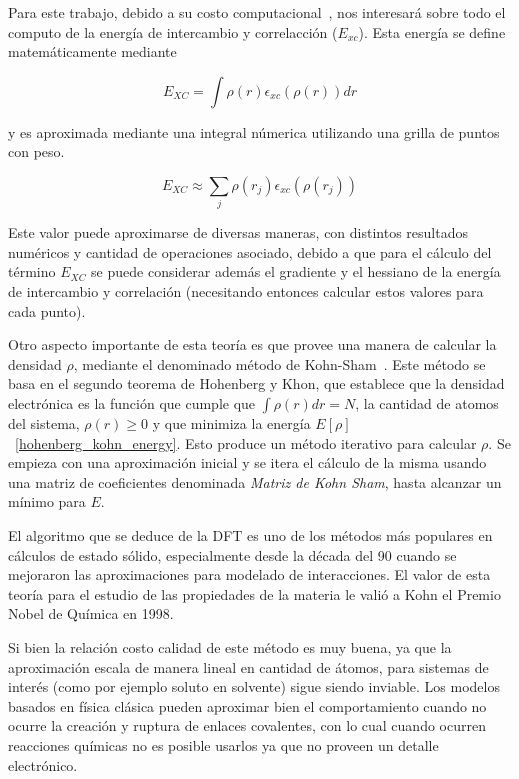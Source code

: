 Para este trabajo, debido a su costo computacional~\cite{LIO}, nos interesar\'a sobre todo el computo de la energ\'ia de intercambio y correlacci\'on ($E_{xc}$).
Esta energ\'ia se define matem\'aticamente mediante

\begin{equation}
    E_{XC} = \int \rho(r) \epsilon_{xc}\left( \rho(r) \right ) dr
\end{equation}

y es aproximada mediante una integral n\'umerica utilizando una grilla de puntos con peso.

\begin{equation}
    \label{approx_excenergy}
    E_{XC} \approx \sum_j \rho(r_j) \epsilon_{xc} (\rho(r_j))
\end{equation}

Este valor puede aproximarse de diversas maneras, con distintos resultados num\'ericos y cantidad de operaciones
asociado, debido a que para el c\'alculo del t\'ermino $E_{XC}$ se puede considerar adem\'as el gradiente
y el hessiano de la energ\'ia de intercambio y correlaci\'on (necesitando entonces calcular
estos valores para cada punto).

Otro aspecto importante de esta teor\'ia es que provee una manera de calcular la densidad $\rho$,
mediante el denominado m\'etodo de Kohn-Sham~\cite{KohnSham}. Este m\'etodo se basa en el segundo teorema
de Hohenberg y Khon, que establece que la densidad electr\'onica es la funci\'on que
cumple que $\int \rho(r) dr = N$, la cantidad de atomos del sistema, $\rho(r) \geq 0$ y que
minimiza la energ\'ia $E[\rho]$~\ref{hohenberg_kohn_energy}. Esto produce
un m\'etodo iterativo para calcular $\rho$. Se empieza con una aproximaci\'on inicial y
se itera el c\'alculo de la misma usando una matriz de coeficientes denominada \textit{Matriz de Kohn Sham}, hasta
alcanzar un m\'inimo para $E$.

El algoritmo que se deduce de la DFT es uno de los m\'etodos m\'as populares en c\'alculos
de estado s\'olido, especialmente desde la d\'ecada del 90 cuando se mejoraron las aproximaciones para modelado de
interacciones. El valor de esta teor\'ia para el estudio de las propiedades de la materia le vali\'o a Kohn el Premio Nobel
de Qu\'imica en 1998.

Si bien la relaci\'on costo calidad de este m\'etodo es muy buena, ya que la aproximaci\'on escala de manera lineal
en cantidad de \'atomos, para sistemas de inter\'es (como por ejemplo soluto en solvente) sigue siendo inviable. Los
modelos basados en f\'isica cl\'asica pueden aproximar bien el comportamiento cuando no ocurre la creaci\'on y ruptura
de enlaces covalentes, con lo cual cuando ocurren reacciones qu\'imicas no es posible usarlos ya que no proveen un
detalle electr\'onico.

